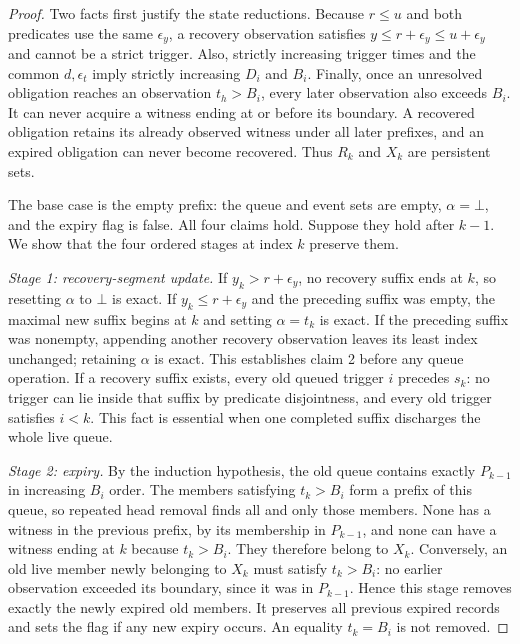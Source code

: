 \begin{proof}
Two facts first justify the state reductions. Because $r\leq u$ and both predicates use the same $\epsilon_y$, a recovery observation satisfies $y\leq r+\epsilon_y\leq u+\epsilon_y$ and cannot be a strict trigger. Also, strictly increasing trigger times and the common $d,\epsilon_t$ imply strictly increasing $D_i$ and $B_i$. Finally, once an unresolved obligation reaches an observation $t_h>B_i$, every later observation also exceeds $B_i$. It can never acquire a witness ending at or before its boundary. A recovered obligation retains its already observed witness under all later prefixes, and an expired obligation can never become recovered. Thus $R_k$ and $X_k$ are persistent sets.

The base case is the empty prefix: the queue and event sets are empty, $\alpha=\bot$, and the expiry flag is false. All four claims hold. Suppose they hold after $k-1$. We show that the four ordered stages at index $k$ preserve them.

\emph{Stage 1: recovery-segment update.} If $y_k>r+\epsilon_y$, no recovery suffix ends at $k$, so resetting $\alpha$ to $\bot$ is exact. If $y_k\leq r+\epsilon_y$ and the preceding suffix was empty, the maximal new suffix begins at $k$ and setting $\alpha=t_k$ is exact. If the preceding suffix was nonempty, appending another recovery observation leaves its least index unchanged; retaining $\alpha$ is exact. This establishes claim 2 before any queue operation. If a recovery suffix exists, every old queued trigger $i$ precedes $s_k$: no trigger can lie inside that suffix by predicate disjointness, and every old trigger satisfies $i<k$. This fact is essential when one completed suffix discharges the whole live queue.

\emph{Stage 2: expiry.} By the induction hypothesis, the old queue contains exactly $P_{k-1}$ in increasing $B_i$ order. The members satisfying $t_k>B_i$ form a prefix of this queue, so repeated head removal finds all and only those members. None has a witness in the previous prefix, by its membership in $P_{k-1}$, and none can have a witness ending at $k$ because $t_k>B_i$. They therefore belong to $X_k$. Conversely, an old live member newly belonging to $X_k$ must satisfy $t_k>B_i$: no earlier observation exceeded its boundary, since it was in $P_{k-1}$. Hence this stage removes exactly the newly expired old members. It preserves all previous expired records and sets the flag if any new expiry occurs. An equality $t_k=B_i$ is not removed.


\end{proof}
